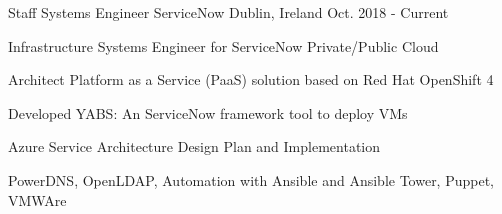 

\begin{cventries}

  \cventry
    {Staff Systems Engineer} %
    {ServiceNow} %
    {Dublin, Ireland} %
    {Oct. 2018 - Current} %
    {
      \begin{cvitems} %
        \item {Infrastructure Systems Engineer for ServiceNow Private/Public Cloud}
        \item {Architect Platform as a Service (PaaS) solution based on Red Hat OpenShift 4}
        \item {Developed YABS: An ServiceNow framework tool to deploy VMs}
        \item {Azure Service Architecture Design Plan and Implementation}
        \item {PowerDNS, OpenLDAP, Automation with Ansible and Ansible Tower, Puppet, VMWAre}
      \end{cvitems}
    }


\end{cventries}
